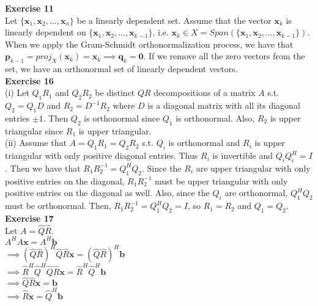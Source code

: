 \documentclass[letterpaper,12pt]{article}
\let\vec\mathbf
\theoremstyle{definition}
\begin{document}
\textbf{Exercise 11} \\
Let $\{\vec{x}_1, \vec{x}_2, ..., \vec{x}_n\}$ be a linearly dependent set. Assume that the vector $\vec{x}_k$ is linearly dependent on $\{\vec{x}_1, \vec{x}_2, ..., \vec{x}_{k-1}\}$, i.e. $\vec{x}_k \in X = Span(\{\vec{x}_1, \vec{x}_2, ..., \vec{x}_{k-1}\})$. When we apply the Gram-Schmidt orthonormalization process, we have that $\vec{p}_{k-1} = proj_X (\vec{x}_k) = \vec{x}_k \implies \vec{q}_k = \vec{0}$. If we remove all the zero vectors from the set, we have an orthonormal set of linearly dependent vectors. \\

\textbf{Exercise 16} \\
(i) Let $Q_1R_1$ and $Q_2R_2$ be distinct $QR$ decompositions of a matrix $A$ s.t. $Q_2 = Q_1D$ and $R_2 = D^{-1}R_2$ where $D$ is a diagonal matrix with all its diagonal entries $\pm 1$. Then $Q_2$ is orthonormal since $Q_1$ is orthonormal. Also, $R_2$ is upper triangular since $R_1$ is upper triangular. \\

(ii) Assume that $A = Q_1R_1 = Q_2R_2$ s.t. $Q_i$ is orthonormal and $R_i$ is upper triangular with only positive diagonal entries. Thus $R_i$ is invertible and $Q_iQ_i^H=I$. Then we have that $R_1R_2^{-1} = Q_1^HQ_2$. Since the $R_i$ are upper triangular with only positive entries on the diagonal, $R_1R_2^{-1}$ must be upper triangular with only positive entries on the diagonal as well. Also, since the $Q_i$ are orthonormal, $Q_1^HQ_2$ must be orthonormal. Then, $R_1R_2^{-1} = Q_1^HQ_2 = I$, so $R_1=R_2$ and $Q_1=Q_2$. \\

\textbf{Exercise 17} \\
Let $A = \hat{Q}\hat{R}$. \\
$A^HA\vec{x} = A^H\vec{b}$ \\
$\implies (\hat{Q}\hat{R})^H\hat{Q}\hat{R}\vec{x}= (\hat{Q}\hat{R})^H\vec{b}$ \\
$\implies \hat{R}^H\hat{Q}^H\hat{Q}\hat{R}\vec{x}= \hat{R}^H\hat{Q}^H\vec{b}$ \\
$\implies \hat{Q}\hat{R}\vec{x}= \vec{b}$ \\
$\implies \hat{R}\vec{x}= \hat{Q}^H\vec{b}$ \\
\end{document}
